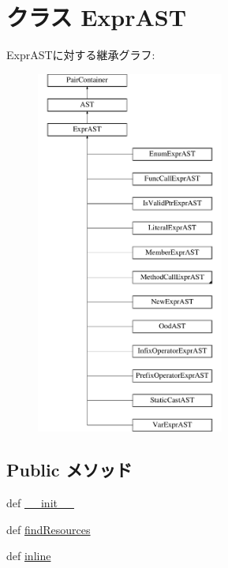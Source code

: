\hypertarget{classslicc_1_1ast_1_1ExprAST_1_1ExprAST}{
\section{クラス ExprAST}
\label{classslicc_1_1ast_1_1ExprAST_1_1ExprAST}
}
ExprASTに対する継承グラフ:\begin{figure}[H]
\begin{center}
\leavevmode
\includegraphics[height=12cm]{classslicc_1_1ast_1_1ExprAST_1_1ExprAST}
\end{center}
\end{figure}
\subsection*{Public メソッド}
\begin{DoxyCompactItemize}
\item 
def \hyperlink{classslicc_1_1ast_1_1ExprAST_1_1ExprAST_ac775ee34451fdfa742b318538164070e}{\_\-\_\-init\_\-\_\-}
\item 
def \hyperlink{classslicc_1_1ast_1_1ExprAST_1_1ExprAST_abd195c795639b490ba2de4c1246105f1}{findResources}
\item 
def \hyperlink{classslicc_1_1ast_1_1ExprAST_1_1ExprAST_a02c03119bb4045f46aedfb6b5271bdab}{inline}
\end{DoxyCompactItemize}


